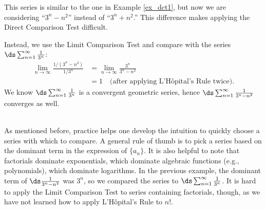 {This series is similar to the one in Example \ref{ex_dct1}, but now we are considering ``$3^n-n^2$'' instead of ``$3^n+n^2$.'' This difference makes applying the Direct Comparison Test difficult.

Instead, we use the Limit Comparison Test and compare with the series $\ds\sum_{n=1}^\infty \frac1{3^n}$:
\begin{align*}
\lim_{n\to\infty}\frac{1/(3^n-n^2)}{1/3^n} &= \lim_{n\to\infty}\frac{3^n}{3^n-n^2} \\
		&= 1 \quad \text{(after applying L'H\^opital's Rule twice)}.
\end{align*}
We know $\ds\sum_{n=1}^\infty \frac1{3^n}$ is a convergent geometric series, hence $\ds\sum_{n=1}^\infty \frac1{3^n-n^2}$ converges as well.
}\\

As mentioned before, practice helps one develop the intuition to quickly choose a series with which to compare. A general rule of thumb is to pick a series based on the dominant term in the expression of $\{a_n\}$. It is also helpful to note that factorials dominate exponentials, which dominate algebraic functions (e.g., polynomials), which dominate logarithms. In the previous example, the dominant term of $\ds\frac{1}{3^n-n^2}$ was $3^n$, so we compared the series to $\ds \sum_{n=1}^\infty \frac1{3^n}$. It is hard to apply the Limit Comparison Test to series containing factorials, though, as we have not learned how to apply L'H\^opital's Rule to $n!$.\\

